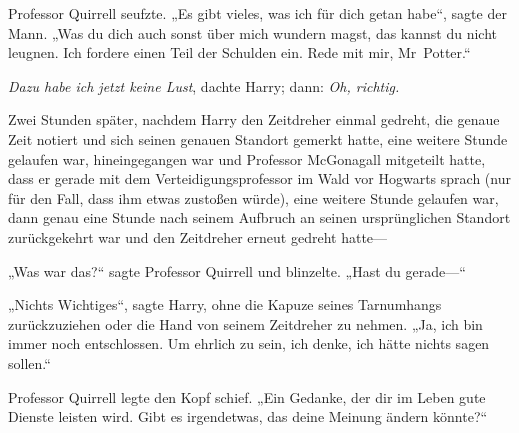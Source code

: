 Professor Quirrell seufzte. „Es gibt vieles, was ich für dich getan habe“, sagte der Mann. „Was du dich auch sonst über mich wundern magst, das kannst du nicht leugnen. Ich fordere einen Teil der Schulden ein. Rede mit mir, Mr~Potter.“

\emph{Dazu habe ich jetzt keine Lust}, dachte Harry; dann: \emph{Oh, richtig.}

\later

Zwei Stunden später, nachdem Harry den Zeitdreher einmal gedreht, die genaue Zeit notiert und sich seinen genauen Standort gemerkt hatte, eine weitere Stunde gelaufen war, hineingegangen war und Professor McGonagall mitgeteilt hatte, dass er gerade mit dem Verteidigungsprofessor im Wald vor Hogwarts sprach (nur für den Fall, dass ihm etwas zustoßen würde), eine weitere Stunde gelaufen war, dann genau eine Stunde nach seinem Aufbruch an seinen ursprünglichen Standort zurückgekehrt war und den Zeitdreher erneut gedreht hatte—

\later

„Was war das?“ sagte Professor Quirrell und blinzelte. „Hast du gerade—“

„Nichts Wichtiges“, sagte Harry, ohne die Kapuze seines Tarnumhangs zurückzuziehen oder die Hand von seinem Zeitdreher zu nehmen. „Ja, ich bin immer noch entschlossen. Um ehrlich zu sein, ich denke, ich hätte nichts sagen sollen.“

Professor Quirrell legte den Kopf schief. „Ein Gedanke, der dir im Leben gute Dienste leisten wird. Gibt es irgendetwas, das deine Meinung ändern könnte?“

